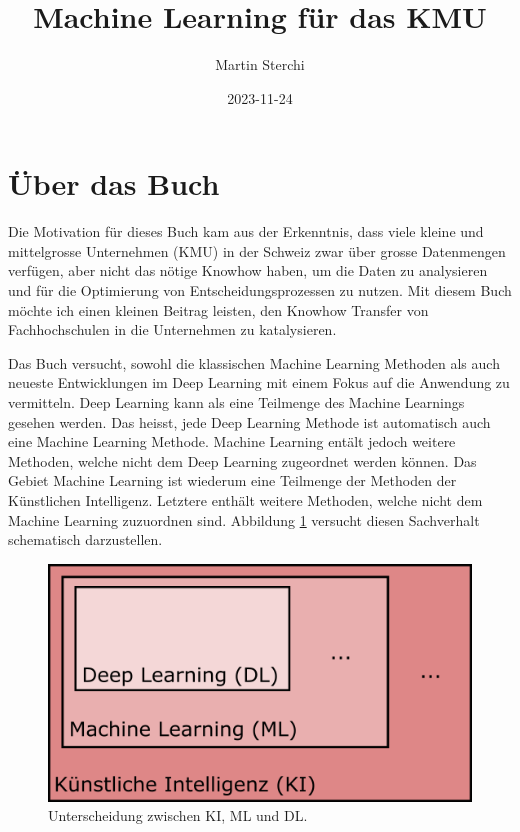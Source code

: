 \documentclass[
]{book}
\title{Machine Learning für das KMU}
\author{Martin Sterchi}
\date{2023-11-24}
\begin{document}
\maketitle

{
\setcounter{tocdepth}{1}
\tableofcontents
}
\hypertarget{uxfcber-das-buch}{%
\chapter*{Über das Buch}\label{uxfcber-das-buch}}

Die Motivation für dieses Buch kam aus der Erkenntnis, dass viele kleine und mittelgrosse Unternehmen (KMU) in der Schweiz zwar über grosse Datenmengen verfügen, aber nicht das nötige Knowhow haben, um die Daten zu analysieren und für die Optimierung von Entscheidungsprozessen zu nutzen. Mit diesem Buch möchte ich einen kleinen Beitrag leisten, den Knowhow Transfer von Fachhochschulen in die Unternehmen zu katalysieren.

Das Buch versucht, sowohl die klassischen Machine Learning Methoden als auch neueste Entwicklungen im Deep Learning mit einem Fokus auf die Anwendung zu vermitteln. Deep Learning kann als eine Teilmenge des Machine Learnings gesehen werden. Das heisst, jede Deep Learning Methode ist automatisch auch eine Machine Learning Methode. Machine Learning entält jedoch weitere Methoden, welche nicht dem Deep Learning zugeordnet werden können. Das Gebiet Machine Learning ist wiederum eine Teilmenge der Methoden der Künstlichen Intelligenz. Letztere enthält weitere Methoden, welche nicht dem Machine Learning zuzuordnen sind. Abbildung \ref{fig:kimldl} versucht diesen Sachverhalt schematisch darzustellen.

\begin{figure}

{\centering \includegraphics[width=0.6\linewidth]{images/KI_ML_DL} 

}

\caption{Unterscheidung zwischen KI, ML und DL. }\label{fig:kimldl}
\end{figure}
\end{document}
